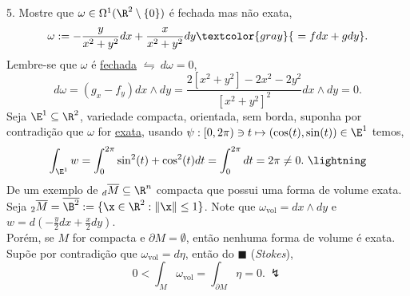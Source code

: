 5. Mostre que \(\omega \in \Omega^1(\R^2\setminus \{0\}) \) é fechada mas não exata,  
\[\omega := -\frac{y}{x^2 + y^2}dx + \frac{x}{x^2+y^2} dy \textcolor{gray}{ \ = fdx + gdy}.\] 
\textcolor{gris}{
    Lembre-se que \(\omega \) é \underline{fechada} \(\leftrightharpoons\ d\omega = 0 \), 
    \[ d\omega = (g_x - f_y) dx \wedge dy = \frac{2[x^2+y^2] - 2x^2 - 2y^2}{[x^2+y^2]^2}dx \wedge dy = 0. \] 
    Seja \(\E^1 \subseteq \R^2\), variedade compacta, orientada, sem borda, suponha por contradição que \(\omega \) for \underline{exata}, usando \(\psi: [0,2\pi) \ni t \mapsto (\cos(t), \sin(t)) \in \E^1\) temos,%
    \[\int_{\E^1}w = \int_0^{2\pi} \sin^2(t) + \cos^2(t)  dt = \int_0^{2\pi}  dt = 2\pi \neq 0. \ \lightning\]
}
\hspace{-0.15cm}De um exemplo de \(_d\overline{M}\subseteq \R^n\) compacta que possui uma forma de volume exata. \\ 
\textcolor{gris}{
    Seja \(_2\overline{M} = \overline{\B^2} := \{\x \in \R^2: \|\x\|\leq 1\}\). Note que \(\omega_\text{vol} = dx \wedge dy\) e \(w = d(-\frac{y}{2}dx+\frac{x}{2}dy)\). 
}\\
Porém, se \(M\) for compacta e \(\partial M = \emptyset \), então nenhuma forma de volume é exata. \\
\textcolor{gris}{
    Supõe por contradição que \(\omega_\text{vol} = d\eta \), então do \(\blacksquare\) (\emph{Stokes}), 
    \[0< \int_M\omega_\text{vol} = \int_{\partial M} \eta = 0. \ \lightning\] 
}
